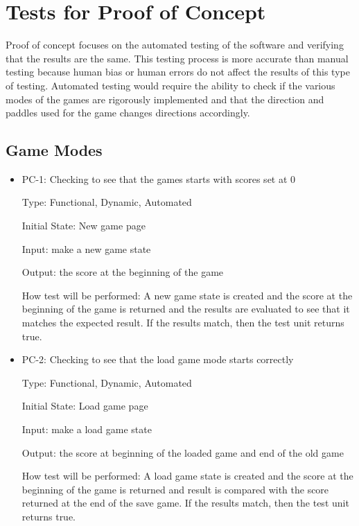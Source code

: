 \documentclass[12pt,letterpaper]{article}
\begin{document}
	\section{Tests for Proof of Concept}
	Proof of concept focuses on the automated testing of the software and verifying that the results are the same. This testing process is more accurate than manual testing because human bias or human errors do not affect the results of this type of testing. Automated testing would require the ability to check if the various modes of the games are rigorously implemented and that the direction and paddles used for the game changes directions accordingly.

	\subsection{Game Modes}

\begin{reqbox}
	\begin{itemize}
	\item PC-1: Checking to see that the games starts with scores set at 0

	Type: Functional, Dynamic, Automated

	Initial State: New game page

	Input: make a new game state
	
	Output: the score at the beginning of the game

	How test will be performed: A new game state is created and the score at the beginning of the game is returned and the results are evaluated to see that it matches the expected result. If the results match, then the test unit returns true.
	\end{itemize}
\end{reqbox}

\begin{reqbox}
	\begin{itemize}
	\item PC-2: Checking to see that the load game mode starts correctly

	Type: Functional, Dynamic, Automated
	
	Initial State: Load game page
	
	Input: make a load game state
	
	Output: the score at beginning of the loaded game and end of the old game

	How test will be performed: A load game state is created and the score at the beginning of the game is returned and result is compared with the score returned at the end of the save game. If the results match, then the test unit returns true.
	\end{itemize}
\end{reqbox}
\end{document}
